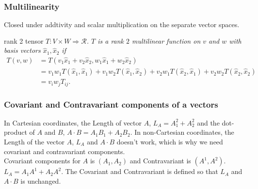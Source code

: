 \subsubsection{Multilinearity} 
Closed under addtivity and scalar multiplication on the separate vector spaces. \\ 
\begin{exmp*} 
rank 2 tensor 
\emph{ 
$T: V \times W \Rightarrow \mathcal{R}$.  $T$ is a rank $2$ multilinear function on $v$ and $w$ with
basis vectors $\hat{x}_1, \hat{x}_2$ if
\begin{equation*} 
\begin{aligned} 
   T(v,w) 
   & = T(v_1\hat{x}_1+v_2\hat{x}_2,w_1\hat{x}_1+w_2\hat{x}_2) \\ 
   & = v_1w_1T(\hat{x}_1,\hat{x}_1)+ v_1w_2T(\hat{x}_1,\hat{x}_2)+ v_2w_1T(\hat{x}_2,\hat{x}_1)+
       v_2w_2T(\hat{x}_2,\hat{x}_2) \\ 
   & = v_iw_jT_{ij}.  
\end{aligned} 
\end{equation*} 
}
\end{exmp*}




\subsubsection{Covariant and Contravariant components of a vectors} In Cartesian coordinates, the
Length of vector $A$, $L_A= A_1^2+A_2^2$ and the dot-product of $A$ and $B$, $A \cdot B= A_1B_1 +
A_2B_2$. In non-Cartesian coordinates, the Length of the vector $A$, $L_A$ and $A\cdot B$ doesn't
work, which is why we need covariant and contravariant components. \\ Covariant components for $A$
is $(A_1,A_2)$ and Contravariant is $(A^1,A^2)$.  $L_A= A_1A^1+A_2A^2$.  The Covariant and
Contravariant is defined so that $L_A$ and $A\cdot B$ is unchanged.

